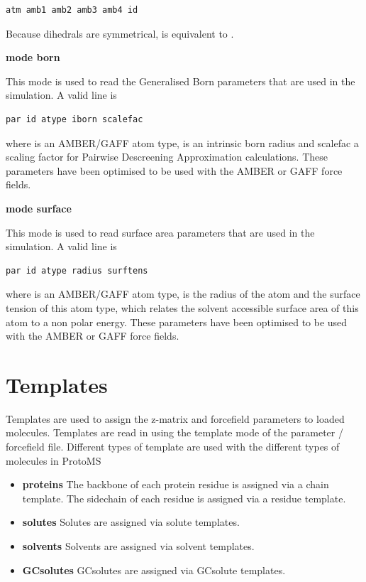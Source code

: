 \documentclass[letterpaper,10pt,english]{sphinxmanual}
\begin{document}
\begin{Verbatim}[commandchars=\\\{\}]
atm amb1 amb2 amb3 amb4 id
\end{Verbatim}

Because dihedrals are symmetrical,  is equivalent to .

\textbf{mode born}

This mode is used to read the Generalised Born parameters that are used in the simulation. A valid line is

\begin{Verbatim}[commandchars=\\\{\}]
par id atype iborn scalefac
\end{Verbatim}

where  is an AMBER/GAFF atom type,  is an intrinsic born radius and scalefac a scaling factor for Pairwise Descreening Approximation calculations. These parameters have been optimised to be used with the AMBER or GAFF force fields.

\textbf{mode surface}

This mode is used to read surface area parameters that are used in the simulation. A valid line is

\begin{Verbatim}[commandchars=\\\{\}]
par id atype radius surftens
\end{Verbatim}

where  is an AMBER/GAFF atom type,  is the radius of the atom and  the surface tension of this atom type, which relates the solvent accessible surface area of this atom to a non polar energy. These parameters have been optimised to be used with the AMBER or GAFF force fields.


\section{Templates}
\label{protoms:templates}\label{protoms:temref}
Templates are used to assign the z-matrix and forcefield parameters to loaded molecules. Templates are read in using the template mode of the parameter / forcefield file. Different types of template are used with the different types of molecules in ProtoMS
\begin{itemize}
\item {} 
\textbf{proteins} The backbone of each protein residue is assigned via a chain template. The sidechain of each residue is assigned via a residue template.

\item {} 
\textbf{solutes} Solutes are assigned via solute templates.

\item {} 
\textbf{solvents} Solvents are assigned via solvent templates.

\item {} 
\textbf{GCsolutes} GCsolutes are assigned via GCsolute templates.

\end{itemize}
\end{document}
